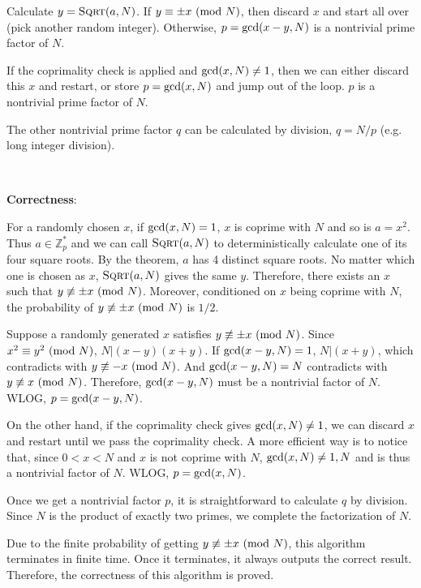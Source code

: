 \documentclass{article}
\begin{document}
Calculate $y=\textsc{Sqrt}(a,N)$. If $y\equiv\pm x\textup{ (mod }N)$, then discard $x$ and start all over (pick another random integer). Otherwise, $p=\textup{gcd}(x-y,N)$ is a nontrivial prime factor of $N$.

If the coprimality check is applied and $\textup{gcd}(x,N)\neq1$, then we can either discard this $x$ and restart, or store $p=\textup{gcd}(x,N)$ and jump out of the loop. $p$ is a nontrivial prime factor of $N$.

The other nontrivial prime factor $q$ can be calculated by division, $q=N/p$ (e.g. long integer division).

~

\noindent\textbf{Correctness}:

For a randomly chosen $x$, if $\textup{gcd}(x,N)=1$, $x$ is coprime with $N$ and so is $a=x^2$. Thus $a\in\mathbb{Z}_p^*$ and we can call $\textsc{Sqrt}(a,N)$ to deterministically calculate one of its four square roots. By the theorem, $a$ has 4 distinct square roots. No matter which one is chosen as $x$, $\textsc{Sqrt}(a,N)$ gives the same $y$. Therefore, there exists an $x$ such that $y\not\equiv\pm x\textup{ (mod }N)$. Moreover, conditioned on $x$ being coprime with $N$, the probability of $y\not\equiv\pm x\textup{ (mod }N)$ is $1/2$.

Suppose a randomly generated $x$ satisfies $y\not\equiv\pm x\textup{ (mod }N)$. Since $x^2\equiv y^2\textup{ (mod }N)$, $N|(x-y)(x+y)$. If $\textup{gcd}(x-y,N)=1$, $N|(x+y)$, which contradicts with $y\not\equiv-x\textup{ (mod }N)$. And $\textup{gcd}(x-y,N)=N$ contradicts with $y\not\equiv x\textup{ (mod }N)$. Therefore, $\textup{gcd}(x-y,N)$ must be a nontrivial factor of $N$. WLOG, $p=\textup{gcd}(x-y,N)$.

On the other hand, if the coprimality check gives $\textup{gcd}(x,N)\neq1$, we can discard $x$ and restart until we pass the coprimality check. A more efficient way is to notice that, since $0<x<N$ and $x$ is not coprime with $N$, $\textup{gcd}(x,N)\neq 1,N$ and is thus a nontrivial factor of $N$. WLOG, $p=\textup{gcd}(x,N)$.

Once we get a nontrivial factor $p$, it is straightforward to calculate $q$ by division. Since $N$ is the product of exactly two primes, we complete the factorization of $N$.

Due to the finite probability of getting $y\not\equiv\pm x\textup{ (mod }N)$, this algorithm terminates in finite time. Once it terminates, it always outputs the correct result. Therefore, the correctness of this algorithm is proved.
\end{document}
